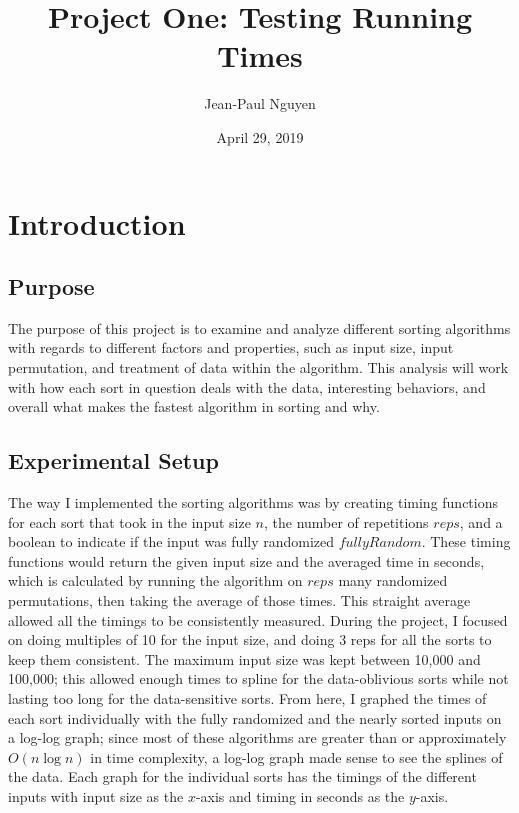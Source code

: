 \documentclass{article}
\title{Project One: Testing Running Times}
\author{Jean-Paul Nguyen}
\date{April 29, 2019}
\begin{document}
\maketitle

\newcommand{\nextblurb}[0]{\vspace{1 em} \newline \noindent}

\section{Introduction}
\subsection{Purpose}
    The purpose of this project is to examine and analyze different sorting 
    algorithms with regards to different factors and properties, such as
    input size, input permutation, and treatment of data within the algorithm.
    This analysis will work with how each sort in question deals with the data,
    interesting behaviors, and overall what makes the fastest algorithm in
    sorting and why. 
\subsection{Experimental Setup}
    The way I implemented the sorting algorithms was by creating timing
    functions for each sort that took in the input size $n$, the number of
    repetitions $reps$, and a boolean to indicate if the input was fully 
    randomized $fullyRandom$. These timing functions would return the given
    input size and the averaged time in seconds, which is calculated by
    running the algorithm on $reps$ many randomized permutations, then taking 
    the average of those times. This straight average allowed all the timings 
    to be consistently measured.
    \nextblurb
    During the project, I focused on doing multiples of 10 for the
    input size, and doing 3 reps for all the sorts to keep them consistent. The
    maximum input size was kept between 10,000 and 100,000; this allowed enough
    times to spline for the data-oblivious sorts while not lasting too long for
    the data-sensitive sorts. From here, I graphed the times of each sort 
    individually with the fully randomized and the nearly sorted inputs on a 
    log-log graph; since most of these algorithms are greater than or 
    approximately $O(n\log{n})$ in time complexity, a log-log graph made sense 
    to see the splines of the data. Each graph for the individual sorts has the 
    timings of the different inputs with input size as the $x$-axis and timing 
    in seconds as the $y$-axis. 
\end{document}
